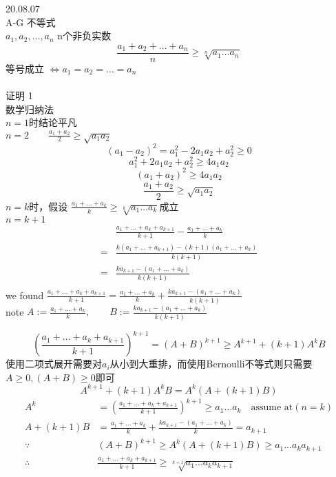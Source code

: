 \documentclass[10pt,a4paper]{article}
\begin{document}
	20.08.07\\
	
	A-G 不等式\\ $a_1, a_2, \dots, a_n$ n个非负实数\\
	\begin{equation}
		\frac{a_1 + a_2 + \dots + a_n}{n} \geq \sqrt[n]{a_1\dots a_n}
	\end{equation}
	等号成立 $\iff a_1 = a_2 = \dots = a_n$	\\
	\\
	证明 1\\
	数学归纳法\\ $n=1$时结论平凡\\
	$n=2\qquad \frac{a_1+a_2}{2} \geq \sqrt{a_1a_2}$\\
	\[(a_1 - a_2)^2 = a_1^2 - 2 a_1 a_2 + a_2^2 \geq 0 \]
	\[a_1^2 + 2a_1a_2 + a_2^2 \geq 4a_1a_2\]
	\[(a_1+a_2)^2\geq 4a_1a_2\]
	\[\frac{a_1+a_2}{2}\geq \sqrt{a_1a_2}\]
	$n=k$时，假设 $\frac{a_1+\dots+a_k}{k}\geq \sqrt[k]{a_1\dots a_k}$成立\\
	$ n=k+1 $
	\begin{equation}
	\begin{aligned}
		&\frac{a_1+\dots + a_k + a_{k+1}}{k+1}-\frac{a_1+\dots +a_k}{k} \\
		=&\frac{k(a_1+\dots+a_{k+1})-(k+1)(a_1+\dots+a_k)}{k(k+1)}\\
		=&\frac{ka_{k+1}-(a_1+\dots+a_k)}{k(k+1)}\\		
	\end{aligned}
	\end{equation}
	we found $\frac{a_1+\dots + a_k + a_{k+1}}{k+1} =  \frac{a_1+\dots + a_k}{k} + \frac{ka_{k+1}-(a_1+\dots + a_k)}{k(k+1)} $\\
	note $ A := \frac{a_1+\dots + a_k}{k} , \qquad B:=\frac{ka_{k+1}-(a_1+\dots + a_k)}{k(k+1)} $
	
	\begin{equation}
		(\frac{a_1+\dots + a_k + a_{k+1}}{k+1})^{k+1}=(A+B)^{k+1}\geq A^{k+1}+(k+1)A^k B
	\end{equation}
	使用二项式展开需要对$ a_i $从小到大重排，而使用Bernoulli不等式则只需要$ A\geq 0, (A+B)\geq 0 $即可
	\begin{equation}
		A^{k+1}+(k+1)A^k B = A^k(A+(k+1)B)
	\end{equation}
	\begin{equation}
		\begin{aligned}
			A^k& =	(\frac{a_1+\dots + a_k + a_{k+1}}{k+1})^{k+1} \geq a_1\dots a_k \quad \text{assume at}(n=k)\\
			A+(k+1)B&= \frac{a_1+\dots + a_k}{k} + \frac{ka_{k+1}-(a_1+\dots + a_k)}{k} = a_{k+1}\\
			\because& (A+B)^{k+1}\geq A^k(A+(k+1)B)\geq a_1 \dots a_k  a_{k+1}\\
			\therefore & 	\frac{a_1+\dots + a_k + a_{k+1}}{k+1} \geq  \sqrt[k+1]{a_1 \dots a_k  a_{k+1}}\\
		\end{aligned}
	\end{equation}
	
\end{document}

